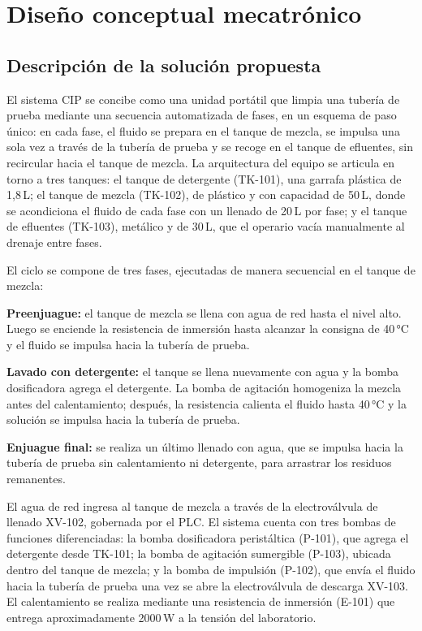\section{Diseño conceptual mecatrónico}\label{sec:diseno_conceptual}

\subsection{Descripción de la solución propuesta}
El sistema CIP se concibe como una unidad portátil que limpia una tubería de prueba mediante una secuencia automatizada de fases, en un esquema de paso único: en cada fase, el fluido se prepara en el tanque de mezcla, se impulsa una sola vez a través de la tubería de prueba y se recoge en el tanque de efluentes, sin recircular hacia el tanque de mezcla. La arquitectura del equipo se articula en torno a tres tanques: el tanque de detergente (TK-101), una garrafa plástica de 1,8\,L; el tanque de mezcla (TK-102), de plástico y con capacidad de 50\,L, donde se acondiciona el fluido de cada fase con un llenado de 20\,L por fase; y el tanque de efluentes (TK-103), metálico y de 30\,L, que el operario vacía manualmente al drenaje entre fases.

El ciclo se compone de tres fases, ejecutadas de manera secuencial en el tanque de mezcla:

\textbf{Preenjuague:} el tanque de mezcla se llena con agua de red hasta el nivel alto. Luego se enciende la resistencia de inmersión hasta alcanzar la consigna de 40\,°C y el fluido se impulsa hacia la tubería de prueba.

\textbf{Lavado con detergente:} el tanque se llena nuevamente con agua y la bomba dosificadora agrega el detergente. La bomba de agitación homogeniza la mezcla antes del calentamiento; después, la resistencia calienta el fluido hasta 40\,°C y la solución se impulsa hacia la tubería de prueba.

\textbf{Enjuague final:} se realiza un último llenado con agua, que se impulsa hacia la tubería de prueba sin calentamiento ni detergente, para arrastrar los residuos remanentes.

El agua de red ingresa al tanque de mezcla a través de la electroválvula de llenado XV-102, gobernada por el PLC. El sistema cuenta con tres bombas de funciones diferenciadas: la bomba dosificadora peristáltica (P-101), que agrega el detergente desde TK-101; la bomba de agitación sumergible (P-103), ubicada dentro del tanque de mezcla; y la bomba de impulsión (P-102), que envía el fluido hacia la tubería de prueba una vez se abre la electroválvula de descarga XV-103. El calentamiento se realiza mediante una resistencia de inmersión (E-101) que entrega aproximadamente 2000\,W a la tensión del laboratorio.

